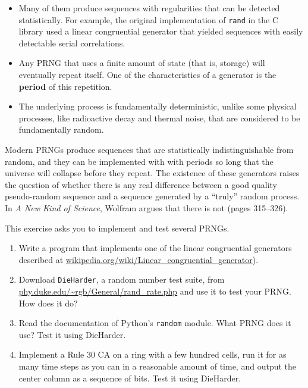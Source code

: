 \documentclass[10pt]{book}
\begin{document}
\begin{itemize}

\item Many of them produce sequences with regularities that
can be detected statistically.  For example, the original implementation
of {\tt rand} in the C library used a linear congruential generator
that yielded sequences with easily detectable serial correlations.

\item Any PRNG that uses a finite amount
of state (that is, storage) will eventually repeat itself.  One of the
characteristics of a generator is the {\bf period} of this
repetition.

\item The underlying process is fundamentally deterministic,
unlike some physical processes, like radioactive decay and
thermal noise, that are considered to be fundamentally
random.

\end{itemize}

Modern PRNGs produce sequences that are statistically
indistinguishable from random, and they can be implemented with with
periods so long that the universe will collapse before they repeat.
The existence of these generators raises the question of whether there
is any real difference between a good quality pseudo-random sequence
and a sequence generated by a ``truly'' random process.  In {\em A New
  Kind of Science}, Wolfram argues that there is not (pages 315--326).

\begin{exercise}

This exercise asks you to implement and test several PRNGs.

\begin{enumerate}

\item Write a program that implements one of the linear congruential
generators described at
\url{wikipedia.org/wiki/Linear_congruential_generator}).

\item Download {\tt DieHarder}, a random number test suite, from
\url{phy.duke.edu/~rgb/General/rand_rate.php} and use it to
test your PRNG.  How does it do?

\item Read the documentation of Python's {\tt random} module.
What PRNG does it use?  Test it using DieHarder.

\item Implement a Rule 30 CA on a ring with a few hundred cells,
run it for as many time steps as you can in a reasonable amount
of time, and output the center column as a sequence of bits.
Test it using DieHarder.

\end{enumerate}

\end{exercise}
\end{document}
